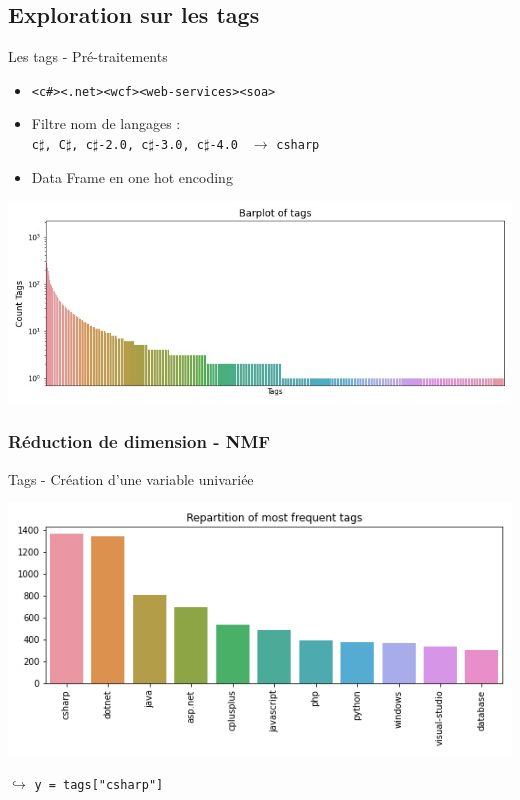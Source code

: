 \documentclass[10pt]{beamer}
\begin{document}
\subsection{Exploration sur les tags}
\begin{frame}{Les tags - Pré-traitements}

\begin{itemize}
    \item \texttt{<c\#><.net><wcf><web-services><soa>}
    \item Filtre nom de langages :\\ \texttt{c$\sharp$, C$\sharp$, c$\sharp$-2.0, c$\sharp$-3.0,  c$\sharp$-4.0 } $\rightarrow$ \texttt{csharp}
    \item Data Frame en one hot encoding 
\end{itemize}
    \begin{center}
       \includegraphics[width=0.9\linewidth]{figures/barplot_tags2.jpg}
    \end{center}
\end{frame}

\subsubsection*{Réduction de dimension - NMF}
\begin{frame}{Tags - Création d'une variable univariée}
    \begin{center}
       \includegraphics[width=0.9\linewidth]{figures/most_freq_tags.png}
    \end{center}
    $\hookrightarrow$  \texttt{y = tags["csharp"]}
\end{frame}
\end{document}
